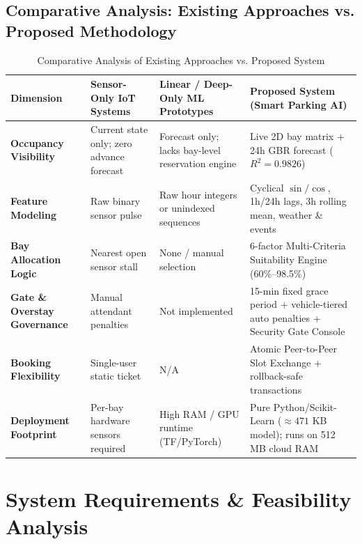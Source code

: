\documentclass[12pt,a4paper,oneside]{report}
\begin{document}
\section{Comparative Analysis: Existing Approaches vs. Proposed Methodology}

\begin{table}[H]
\centering
\caption{Comparative Analysis of Existing Approaches vs. Proposed System}
\label{tab:lit_comparison}
\small
\begin{tabularx}{\textwidth}{>{\bfseries}p{3.0cm} X X X}
\toprule
\textbf{Dimension} & \textbf{Sensor-Only IoT Systems} & \textbf{Linear / Deep-Only ML Prototypes} & \textbf{Proposed System (Smart Parking AI)} \\
\midrule
Occupancy Visibility & Current state only; zero advance forecast & Forecast only; lacks bay-level reservation engine & Live 2D bay matrix + 24h GBR forecast ($R^2 = 0.9826$) \\
\addlinespace
Feature Modeling & Raw binary sensor pulse & Raw hour integers or unindexed sequences & Cyclical $\sin/\cos$, 1h/24h lags, 3h rolling mean, weather \& events \\
\addlinespace
Bay Allocation Logic & Nearest open sensor stall & None / manual selection & 6-factor Multi-Criteria Suitability Engine (60\%--98.5\%) \\
\addlinespace
Gate \& Overstay Governance & Manual attendant penalties & Not implemented & 15-min fixed grace period + vehicle-tiered auto penalties + Security Gate Console \\
\addlinespace
Booking Flexibility & Single-user static ticket & N/A & Atomic Peer-to-Peer Slot Exchange + rollback-safe transactions \\
\addlinespace
Deployment Footprint & Per-bay hardware sensors required & High RAM / GPU runtime (TF/PyTorch) & Pure Python/Scikit-Learn ($\approx 471$ KB model); runs on 512 MB cloud RAM \\
\bottomrule
\end{tabularx}
\end{table}

\chapter{System Requirements \& Feasibility Analysis}
\end{document}
